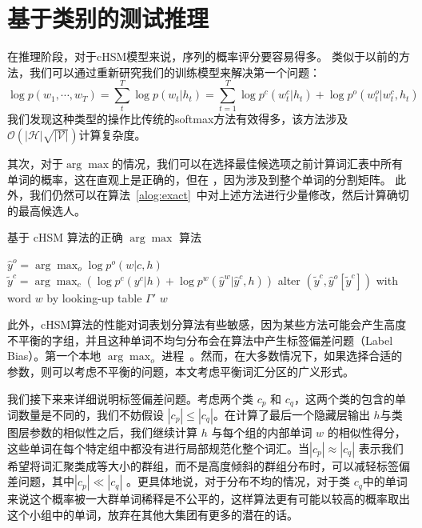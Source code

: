 \section{基于类别的测试推理}
在推理阶段，对于cHSM模型来说，序列的概率评分要容易得多。
类似于以前的方法，我们可以通过重新研究我们的训练模型来解决第一个问题：
\begin{equation}\label{equ:class_inf}
   \log p(w_1,\cdots, w_T)=\sum_t^T\log p(w_t|h_t)=\sum_{t=1}^{T}\log p^c(w^c_t|h_t) +\log p^o(w^o_t|w^c_t,h_t)
\end{equation}
我们发现这种类型的操作比传统的softmax方法有效得多，该方法涉及$ \mathcal{O(|H|\sqrt{|V|})}$计算复杂度。

其次，对于$\arg\max $的情况，我们可以在选择最佳候选项之前计算词汇表中所有单词的概率，这在直观上是正确的，但在
，因为涉及到整个单词的分割矩阵。 此外，我们仍然可以在算法~\ref{alog:exact}~中对上述方法进行少量修改，然后计算确切的最高候选人。
\begin{algorithm}[!ht]
\caption{基于 cHSM 算法的正确 $\arg\max$ 算法}\label{alog:exact}
 $\hat y^o=\arg\max_o{\log p^o(w| c,h)}$ 
 $\tilde y^c=\arg\max_c{(\log p^c(y^c|h)+\log p^w(\hat y^w|\hat y^c,h))}$
 alter $(\tilde y^c,\hat y^o[\tilde y^c])$ with word $w$ by looking-up table $\Gamma'$ \;
 \Return $w$ \;
\end{algorithm}

此外，cHSM算法的性能对词表划分算法有些敏感，因为某些方法可能会产生高度不平衡的字组，并且这种单词不均匀分布会在算法中产生标签偏差问题（Label Bias）。第一个本地 $\arg\max_o$ 进程~。然而，在大多数情况下，如果选择合适的参数，则可以考虑不平衡的问题，本文考虑平衡词汇分区的广义形式。

我们接下来来详细说明标签偏差问题。考虑两个类 $ c_p $ 和 $ c_q $，这两个类的包含的单词数量是不同的，我们不妨假设 $| c_p | \le | c_q |$。在计算了最后一个隐藏层输出 $h$与类图层参数的相似性之后，我们继续计算 $h$ 与每个组的内部单词 $w$ 的相似性得分，这些单词在每个特定组中都没有进行局部规范化整个词汇。当$ | c_p | \approx|c_q|$ 表示我们希望将词汇聚类成等大小的群组，而不是高度倾斜的群组分布时，可以减轻标签偏差问题，其中$ | c_p | \ll | c_q | $ 。更具体地说，对于分布不均的情况，对于类 $ c_q $中的单词来说这个概率被一大群单词稀释是不公平的，这样算法更有可能以较高的概率取出这个小组中的单词，放弃在其他大集团有更多的潜在的话。

